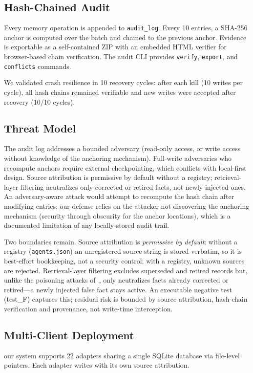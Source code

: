 \documentclass{llncs}
\begin{document}
\subsection{Hash-Chained Audit}
Every memory operation is appended to \texttt{audit\_log}. Every 10 entries, a SHA-256 anchor is computed over the batch and chained to the previous anchor. Evidence is exportable as a self-contained ZIP with an embedded HTML verifier for browser-based chain verification. The audit CLI provides \texttt{verify}, \texttt{export}, and \texttt{conflicts} commands.


We validated crash resilience in 10 recovery cycles: after each kill (10 writes per cycle), all hash chains remained verifiable and new writes were accepted after recovery (10/10 cycles).

\subsection{Threat Model}

The audit log addresses a bounded adversary (read-only access, or write access without knowledge of the anchoring mechanism). Full-write adversaries who recompute anchors require external checkpointing, which conflicts with local-first design. Source attribution is permissive by default without a registry; retrieval-layer filtering neutralizes only corrected or retired facts, not newly injected ones. An adversary-aware attack would attempt to recompute the hash chain after modifying entries; our defense relies on the attacker not discovering the anchoring mechanism (security through obscurity for the anchor locations), which is a documented limitation of any locally-stored audit trail.

Two boundaries remain. Source attribution is \emph{permissive by default}: without a registry (\texttt{agents.json}) an unregistered source string is stored verbatim, so it is best-effort bookkeeping, not a security control; with a registry, unknown sources are rejected. Retrieval-layer filtering excludes superseded and retired records but, unlike the poisoning attacks of~\cite{agentpoison}, only neutralizes facts already corrected or retired---a newly injected false fact stays active. An executable negative test (test\_F) captures this; residual risk is bounded by source attribution, hash-chain verification and provenance, not write-time interception.

\subsection{Multi-Client Deployment}
our system supports 22 adapters sharing a single SQLite database via file-level pointers. Each adapter writes with its own source attribution.
\end{document}
